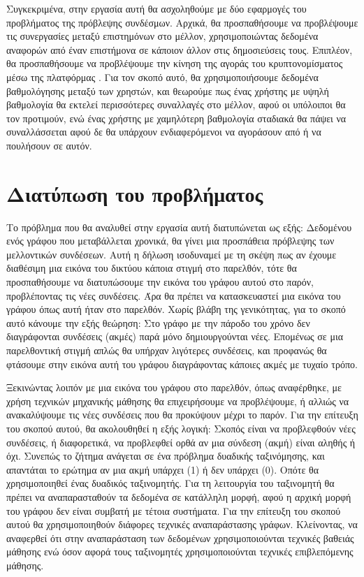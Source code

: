 Συγκεκριμένα, στην εργασία αυτή θα ασχοληθούμε με δύο εφαρμογές του προβλήματος της πρόβλεψης συνδέσμων.
Αρχικά, θα προσπαθήσουμε να προβλέψουμε τις συνεργασίες μεταξύ επιστημόνων στο μέλλον, χρησιμοποιώντας
δεδομένα αναφορών από έναν επιστήμονα σε κάποιον άλλον στις δημοσιεύσεις τους. Επιπλέον, θα 
προσπαθήσουμε να προβλέψουμε την κίνηση της αγοράς του κρυπτονομίσματος  μέσω της 
πλατφόρμας . Για τον σκοπό αυτό, θα χρησιμοποιήσουμε δεδομένα βαθμολόγησης μεταξύ των χρηστών,
και θεωρούμε πως ένας χρήστης με υψηλή βαθμολογία θα εκτελεί περισσότερες συναλλαγές στο μέλλον, 
αφού οι υπόλοιποι θα τον προτιμούν, ενώ ένας χρήστης με χαμηλότερη βαθμολογία σταδιακά θα πάψει
να συναλλάσσεται αφού δε θα υπάρχουν ενδιαφερόμενοι να αγοράσουν από ή να πουλήσουν σε αυτόν.

\section{Διατύπωση του προβλήματος} \label{problem_statement}

Το πρόβλημα που θα αναλυθεί στην εργασία αυτή διατυπώνεται ως εξής:
Δεδομένου ενός γράφου που μεταβάλλεται χρονικά, θα γίνει μια προσπάθεια πρόβλεψης των μελλοντικών συνδέσεων. Αυτή η δήλωση 
ισοδυναμεί με τη σκέψη πως αν έχουμε διαθέσιμη μια εικόνα του δικτύου κάποια στιγμή στο παρελθόν, 
τότε θα προσπαθήσουμε να διατυπώσουμε την εικόνα του γράφου αυτού στο παρόν, προβλέποντας τις νέες 
συνδέσεις. Άρα θα πρέπει να κατασκευαστεί μια εικόνα του γράφου όπως αυτή ήταν στο παρελθόν. Χωρίς
βλάβη της γενικότητας, για το σκοπό αυτό κάνουμε την εξής θεώρηση: Στο γράφο με την πάροδο του χρόνο
δεν διαγράφονται συνδέσεις (ακμές) παρά μόνο δημιουργούνται νέες. Επομένως σε μια παρελθοντική στιγμή
απλώς θα υπήρχαν λιγότερες συνδέσεις, και προφανώς θα φτάσουμε στην εικόνα αυτή του γράφου διαγράφοντας
κάποιες ακμές με τυχαίο τρόπο.

Ξεκινώντας λοιπόν με μια εικόνα του γράφου στο παρελθόν, όπως αναφέρθηκε, με χρήση τεχνικών μηχανικής
μάθησης θα επιχειρήσουμε να προβλέψουμε, ή αλλιώς να ανακαλύψουμε τις νέες συνδέσεις που θα προκύψουν
μέχρι το παρόν. Για την επίτευξη του σκοπού αυτού, θα ακολουθηθεί η εξής λογική: Σκοπός είναι να 
προβλεφθούν νέες συνδέσεις, ή διαφορετικά, να προβλεφθεί ορθά αν μια σύνδεση (ακμή) είναι αληθής ή 
όχι. Συνεπώς το ζήτημα ανάγεται σε ένα πρόβλημα δυαδικής ταξινόμησης, και απαντάται το ερώτημα αν μια
ακμή υπάρχει (1) ή δεν υπάρχει (0). Οπότε θα χρησιμοποιηθεί ένας δυαδικός ταξινομητής. Για τη 
λειτουργία του ταξινομητή θα πρέπει να αναπαρασταθούν τα δεδομένα σε κατάλληλη μορφή, αφού η αρχική
μορφή του γράφου δεν είναι συμβατή με τέτοια συστήματα. Για την επίτευξη του σκοπού αυτού θα 
χρησιμοποιηθούν διάφορες τεχνικές αναπαράστασης γράφων. Κλείνοντας, να αναφερθεί ότι στην αναπαράσταση των δεδομένων 
χρησιμοποιούνται τεχνικές βαθειάς μάθησης ενώ όσον αφορά τους ταξινομητές χρησιμοποιούνται τεχνικές επιβλεπόμενης μάθησης.


